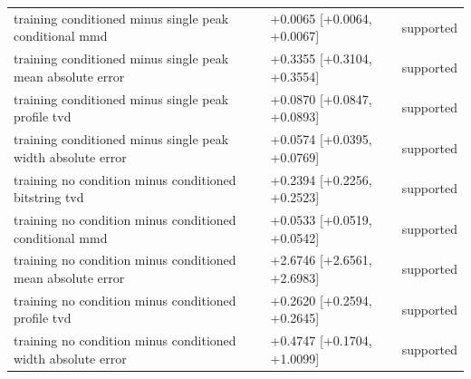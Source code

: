 \begin{table}[p]
\begin{tabular}{@{}p{}p{}p{}@{}}
training conditioned minus single peak conditional mmd & +0.0065 [+0.0064, +0.0067] & supported \\
training conditioned minus single peak mean absolute error & +0.3355 [+0.3104, +0.3554] & supported \\
training conditioned minus single peak profile tvd & +0.0870 [+0.0847, +0.0893] & supported \\
training conditioned minus single peak width absolute error & +0.0574 [+0.0395, +0.0769] & supported \\
training no condition minus conditioned bitstring tvd & +0.2394 [+0.2256, +0.2523] & supported \\
training no condition minus conditioned conditional mmd & +0.0533 [+0.0519, +0.0542] & supported \\
training no condition minus conditioned mean absolute error & +2.6746 [+2.6561, +2.6983] & supported \\
training no condition minus conditioned profile tvd & +0.2620 [+0.2594, +0.2645] & supported \\
training no condition minus conditioned width absolute error & +0.4747 [+0.1704, +1.0099] & supported \\
\bottomrule
\end{tabular}
\end{table}
\clearpage
